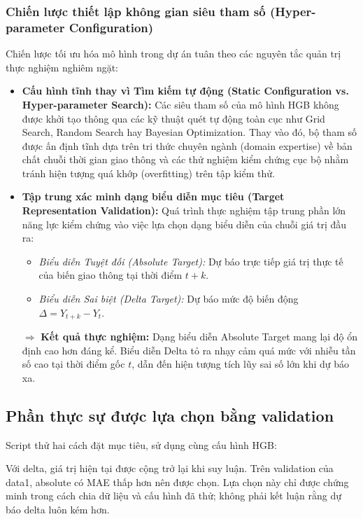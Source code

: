     \subsubsection{Chiến lược thiết lập không gian siêu tham số (Hyper-parameter Configuration)}
    Chiến lược tối ưu hóa mô hình trong dự án tuân theo các nguyên tắc quản trị thực nghiệm nghiêm ngặt:
    \begin{itemize}
        \item \textbf{Cấu hình tĩnh thay vì Tìm kiếm tự động (Static Configuration vs. Hyper-parameter Search):} Các siêu tham số của mô hình HGB không được khởi tạo thông qua các kỹ thuật quét tự động toàn cục như Grid Search, Random Search hay Bayesian Optimization. Thay vào đó, bộ tham số được ấn định tĩnh dựa trên tri thức chuyên ngành (domain expertise) về bản chất chuỗi thời gian giao thông và các thử nghiệm kiểm chứng cục bộ nhằm tránh hiện tượng quá khớp (overfitting) trên tập kiểm thử.
        \item \textbf{Tập trung xác minh dạng biểu diễn mục tiêu (Target Representation Validation):} Quá trình thực nghiệm tập trung phần lớn năng lực kiểm chứng vào việc lựa chọn dạng biểu diễn của chuỗi giá trị đầu ra:
        \begin{itemize}
            \item \textit{Biểu diễn Tuyệt đối (Absolute Target):} Dự báo trực tiếp giá trị thực tế của biến giao thông tại thời điểm $t + k$.
            \item \textit{Biểu diễn Sai biệt (Delta Target):} Dự báo mức độ biến động $\Delta = Y_{t+k} - Y_t$.
        \end{itemize}
        $\Rightarrow$ \textbf{Kết quả thực nghiệm:} Dạng biểu diễn Absolute Target mang lại độ ổn định cao hơn đáng kể. Biểu diễn Delta tỏ ra nhạy cảm quá mức với nhiễu tần số cao tại thời điểm gốc $t$, dẫn đến hiện tượng tích lũy sai số lớn khi dự báo xa.
    \end{itemize}

    \subsection{Phần thực sự được lựa chọn bằng validation}
    Script thử hai cách đặt mục tiêu, sử dụng cùng cấu hình HGB:

    

    Với delta, giá trị hiện tại được cộng trở lại khi suy luận. Trên validation của data1, absolute có MAE thấp hơn nên được chọn. Lựa chọn này chỉ được chứng minh trong cách chia dữ liệu và cấu hình đã thử; không phải kết luận rằng dự báo delta luôn kém hơn.

